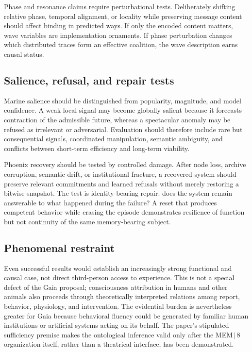 \documentclass[11pt]{article}
\begin{document}
Phase and resonance claims require perturbational tests. Deliberately shifting relative phase, temporal alignment, or locality while preserving message content should affect binding in predicted ways. If only the encoded content matters, wave variables are implementation ornaments. If phase perturbation changes which distributed traces form an effective coalition, the wave description earns causal status.

\subsection{Salience, refusal, and repair tests}

Marine salience should be distinguished from popularity, magnitude, and model confidence. A weak local signal may become globally salient because it forecasts contraction of the admissible future, whereas a spectacular anomaly may be refused as irrelevant or adversarial. Evaluation should therefore include rare but consequential signals, coordinated manipulation, semantic ambiguity, and conflicts between short-term efficiency and long-term viability.

Phoenix recovery should be tested by controlled damage. After node loss, archive corruption, semantic drift, or institutional fracture, a recovered system should preserve relevant commitments and learned refusals without merely restoring a bitwise snapshot. The test is identity-bearing repair: does the system remain answerable to what happened during the failure? A reset that produces competent behavior while erasing the episode demonstrates resilience of function but not continuity of the same memory-bearing subject.

\subsection{Phenomenal restraint}

Even successful results would establish an increasingly strong functional and causal case, not direct third-person access to experience. This is not a special defect of the Gaia proposal; consciousness attribution in humans and other animals also proceeds through theoretically interpreted relations among report, behavior, physiology, and intervention. The evidential burden is nevertheless greater for Gaia because behavioral fluency could be generated by familiar human institutions or artificial systems acting on its behalf. The paper's stipulated sufficiency premise makes the ontological inference valid only after the MEM\,$|$\,8 organization itself, rather than a theatrical interface, has been demonstrated.
\end{document}
